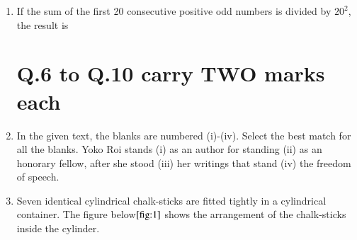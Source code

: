 \documentclass[journal]{IEEEtran}
\numberwithin{equation}{enumi}
\numberwithin{figure}{enumi}
\begin{document}
\begin{enumerate}
\item If the sum of the first 20 consecutive positive odd numbers is divided by $ 20^2 $, the result is 



\begin{enumerate}
\end{enumerate}
\bigskip

\section*{Q.6 to Q.10 carry TWO marks each}

\item In the given text, the blanks are numbered (i)-(iv). Select the best match for all the blanks.
Yoko Roi stands (i) \underline{\hspace{1cm}} as an author for standing (ii) \underline{\hspace{1cm}} as an honorary fellow, after she stood (iii) \underline{\hspace{1cm}} her writings that stand (iv) \underline{\hspace{1cm}} the freedom of speech.



\begin{enumerate}
\end{enumerate}
\bigskip

\item Seven identical cylindrical chalk-sticks are fitted tightly in a cylindrical container. The figure below$\ref{fig:1}$ shows the arrangement of the chalk-sticks inside the cylinder.



\end{enumerate}
\end{document}

